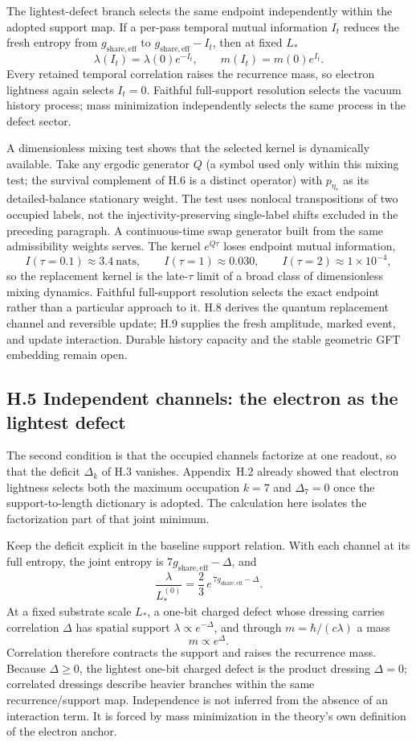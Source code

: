 \documentclass[11pt]{article}
\begin{document}
The lightest-defect branch selects the same endpoint independently within the adopted support map. If a per-pass temporal mutual information $I_t$ reduces the fresh entropy from $g_{\mathrm{share,eff}}$ to $g_{\mathrm{share,eff}}-I_t$, then at fixed $L_*$
\[
\lambda(I_t)=\lambda(0)e^{-I_t},
\qquad
m(I_t)=m(0)e^{I_t}.
\]
Every retained temporal correlation raises the recurrence mass, so electron lightness again selects $I_t=0$. Faithful full-support resolution selects the vacuum history process; mass minimization independently selects the same process in the defect sector.

A dimensionless mixing test shows that the selected kernel is dynamically available. Take any ergodic generator $Q$ (a symbol used only within this mixing test; the survival complement of H.6 is a distinct operator) with $p_{\eta_*}$ as its detailed-balance stationary weight. The test uses nonlocal transpositions of two occupied labels, not the injectivity-preserving single-label shifts excluded in the preceding paragraph. A continuous-time swap generator built from the same admissibility weights serves. The kernel $e^{Q\tau}$ loses endpoint mutual information,
\[
I(\tau{=}0.1)\approx 3.4~\text{nats},
\qquad
I(\tau{=}1)\approx 0.030,
\qquad
I(\tau{=}2)\approx 1\times10^{-4},
\]
so the replacement kernel is the late-$\tau$ limit of a broad class of dimensionless mixing dynamics. Faithful full-support resolution selects the exact endpoint rather than a particular approach to it. H.8 derives the quantum replacement channel and reversible update; H.9 supplies the fresh amplitude, marked event, and update interaction. Durable history capacity and the stable geometric GFT embedding remain open.

\subsection*{H.5 Independent channels: the electron as the lightest defect}

The second condition is that the occupied channels factorize at one readout, so that the deficit $\Delta_k$ of H.3 vanishes. Appendix~H.2 already showed that electron lightness selects both the maximum occupation $k=7$ and $\Delta_7=0$ once the support-to-length dictionary is adopted. The calculation here isolates the factorization part of that joint minimum.

Keep the deficit explicit in the baseline support relation. With each channel at its full entropy, the joint entropy is $7g_{\mathrm{share,eff}}-\Delta$, and
\[
\frac{\lambda}{L_*^{(0)}}=\frac23\,e^{\,7g_{\mathrm{share,eff}}-\Delta}.
\]
At a fixed substrate scale $L_*$, a one-bit charged defect whose dressing carries correlation $\Delta$ has spatial support $\lambda\propto e^{-\Delta}$, and through $m=\hbar/(c\lambda)$ a mass
\[
m\propto e^{\Delta}.
\]
Correlation therefore contracts the support and raises the recurrence mass. Because $\Delta\ge0$, the lightest one-bit charged defect is the product dressing $\Delta=0$; correlated dressings describe heavier branches within the same recurrence/support map. Independence is not inferred from the absence of an interaction term. It is forced by mass minimization in the theory's own definition of the electron anchor.
\end{document}
